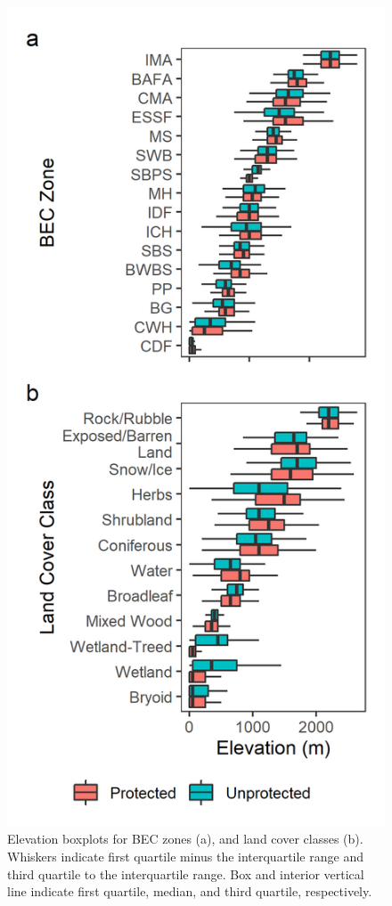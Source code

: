 \documentclass[10pt,oneside]{article}
\makeatletter
\def\maxwidth{\ifdim\Gin@nat@width>\linewidth\linewidth
\else\Gin@nat@width\fi}
\let\Oldincludegraphics\includegraphics
\renewcommand{\includegraphics}[1]{\Oldincludegraphics[width=\maxwidth]{#1}}
\makeatother
\begin{document}
\begin{figure}
\hypertarget{fig:elev-boxplots}{%
\centering
\includegraphics{figures/elev_boxplots.png}
\caption{Elevation boxplots for BEC zones (a), and land cover classes
(b). Whiskers indicate first quartile minus the interquartile range and
third quartile to the interquartile range. Box and interior vertical
line indicate first quartile, median, and third quartile,
respectively.}\label{fig:elev-boxplots}
}
\end{figure}
\end{document}
